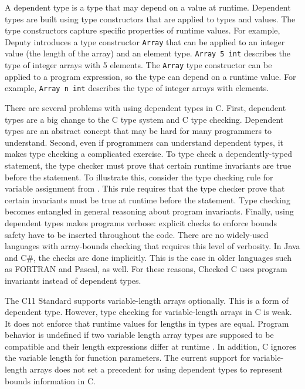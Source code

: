 A dependent type is a type that may depend on a value at runtime.
Dependent types are built using type constructors that are applied to
types and values. The type constructors capture specific properties of
runtime values. For example, Deputy introduces a type constructor
\verb|Array| that can be applied to an integer value (the length of the
array) and an element type. \verb|Array 5 int| describes the type of
integer arrays with 5 elements. The \verb|Array| type constructor can be
applied to a program expression, so the type can depend
on a runtime value. For example, \verb|Array n int| describes the type
of integer arrays with  elements.

There are several problems with using dependent types in C.
First, dependent types are a big change to the
C type system and C type checking. Dependent types are an abstract
concept that may be hard for many programmers to understand. 
Second, even if
programmers can understand dependent types, it makes type checking a
complicated exercise.  To type check a dependently-typed statement, the
type checker must prove that certain runtime invariants are true before
the statement. To illustrate this, consider the type checking rule for
variable assignment from \cite{Condit2007}. This
rule requires that the type checker prove that certain invariants must
be true at runtime before the statement. Type checking becomes entangled
in general reasoning about program invariants.
Finally, using dependent types makes programs verbose: explicit
checks to enforce bounds safety have to be inserted throughout the code. There
are no widely-used languages with array-bounds checking
that requires this level of verbosity. In Java and C\#, the checks are
done implicitly. This is the case in older languages such as FORTRAN
and Pascal, as well.  For these reasons, Checked C uses program invariants
instead of dependent types.

The C11 Standard supports variable-length arrays optionally.  This is a
form of dependent type.  However, type checking for variable-length arrays
in C is weak.  It does not enforce that runtime 
values for lengths in types are equal. Program behavior is undefined if two variable 
length array types are supposed to be compatible and their length expressions differ at
runtime \cite[Section 6.7.6.2]{ISO2011}. In addition, C ignores the variable length 
for function
parameters.  The current support for variable-length arrays does not set a precedent 
for using dependent types to represent bounds information in C.

